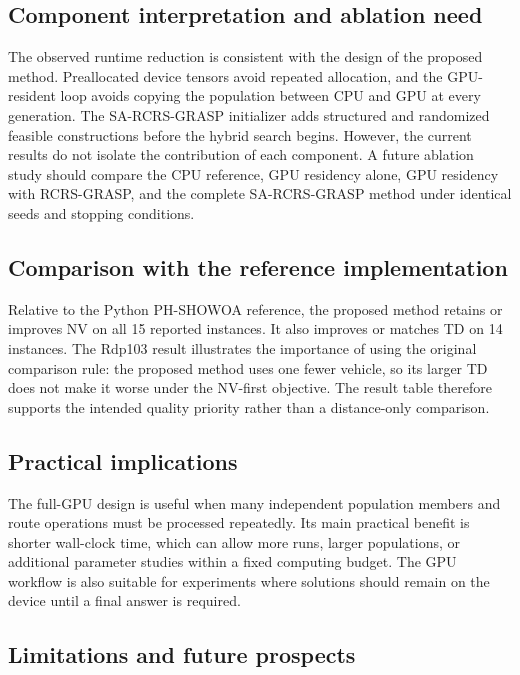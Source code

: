 \documentclass[pdflatex,sn-mathphys-num]{sn-jnl}
\begin{document}
\subsection{Component interpretation and ablation need}

The observed runtime reduction is consistent with the design of the proposed method. Preallocated device tensors avoid repeated allocation, and the GPU-resident loop avoids copying the population between CPU and GPU at every generation. The SA-RCRS-GRASP initializer adds structured and randomized feasible constructions before the hybrid search begins. However, the current results do not isolate the contribution of each component. A future ablation study should compare the CPU reference, GPU residency alone, GPU residency with RCRS-GRASP, and the complete SA-RCRS-GRASP method under identical seeds and stopping conditions.

\subsection{Comparison with the reference implementation}

Relative to the Python PH-SHOWOA reference, the proposed method retains or improves NV on all 15 reported instances. It also improves or matches TD on 14 instances. The Rdp103 result illustrates the importance of using the original comparison rule: the proposed method uses one fewer vehicle, so its larger TD does not make it worse under the NV-first objective. The result table therefore supports the intended quality priority rather than a distance-only comparison.

\subsection{Practical implications}

The full-GPU design is useful when many independent population members and route operations must be processed repeatedly. Its main practical benefit is shorter wall-clock time, which can allow more runs, larger populations, or additional parameter studies within a fixed computing budget. The GPU workflow is also suitable for experiments where solutions should remain on the device until a final answer is required.

\subsection{Limitations and future prospects}
\end{document}
